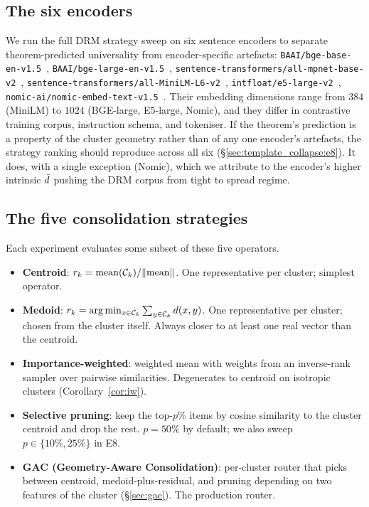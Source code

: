 \subsection{The six encoders}
\label{sec:experiments:encoders}

We run the full DRM strategy sweep on six sentence
encoders to separate theorem-predicted universality from encoder-specific
artefacts:
\texttt{BAAI/bge-base-en-v1.5}~\cite{xiao2023bge},
\texttt{BAAI/bge-large-en-v1.5}~\cite{xiao2023bge},
\texttt{sentence-transformers/all-mpnet-base-v2}~\cite{song2020mpnet},
\texttt{sentence-transformers/all-MiniLM-L6-v2}~\cite{wang2020minilm},
\texttt{intfloat/e5-large-v2}~\cite{wang2022e5},
\texttt{nomic-ai/nomic-embed-text-v1.5}~\cite{nussbaum2024nomic}.
Their embedding dimensions range from $384$ (MiniLM) to $1024$ (BGE-large,
E5-large, Nomic), and they differ in contrastive training corpus,
instruction schema, and tokeniser. If the theorem's prediction is a
property of the cluster geometry rather than of any one encoder's
artefacts, the strategy ranking should reproduce across all six
(\S\ref{sec:template_collapse:e8}). It does, with a single exception
(Nomic), which we attribute to the encoder's higher intrinsic $\bar{d}$
pushing the DRM corpus from tight to spread regime.

\subsection{The five consolidation strategies}
\label{sec:experiments:strategies}

Each experiment evaluates some subset of these five operators.

\begin{itemize}[leftmargin=1.8em, itemsep=2pt]
\item \textbf{Centroid}: $r_k = \mathrm{mean}(\mathcal{C}_k) /
\lVert \mathrm{mean} \rVert$. One representative per cluster;
simplest operator.
\item \textbf{Medoid}: $r_k = \arg\min_{x \in \mathcal{C}_k}
\sum_{y \in \mathcal{C}_k} d(x, y)$. One representative per cluster;
chosen from the cluster itself. Always closer to at least one real
vector than the centroid.
\item \textbf{Importance-weighted}: weighted mean with weights from an
inverse-rank sampler over pairwise similarities. Degenerates to
centroid on isotropic clusters (Corollary~\ref{cor:iw}).
\item \textbf{Selective pruning}: keep the top-$p$\% items by cosine
similarity to the cluster centroid and drop the rest. $p = 50\%$ by
default; we also sweep $p \in \{10\%, 25\%\}$ in E8.
\item \textbf{GAC (Geometry-Aware Consolidation)}: per-cluster router
that picks between centroid, medoid-plus-residual, and pruning
depending on two features of the cluster (\S\ref{sec:gac}). The
production router.
\end{itemize}


